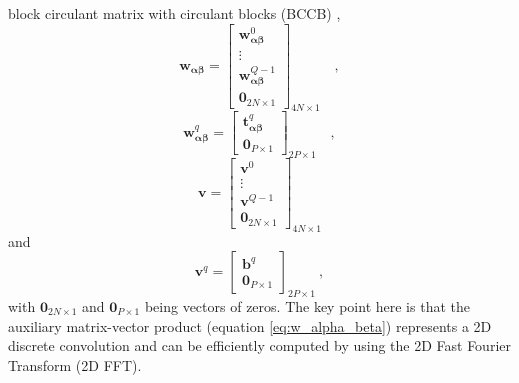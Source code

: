 \documentclass[manuscript,noblind]{geophysics}
\begin{document}
block circulant matrix with circulant blocks (BCCB) \citep[e.g., ][ p. 184]{davis1979},
\begin{equation}
	\mathbf{w}_{\boldsymbol{\alpha\beta}} = \begin{bmatrix}
		\mathbf{w}_{\boldsymbol{\alpha\beta}}^{0} \\
		\vdots \\
		\mathbf{w}_{\boldsymbol{\alpha\beta}}^{Q - 1} \\
		\mathbf{0}_{2N \times 1}
	\end{bmatrix}_{4N \times 1} \quad ,
	\label{eq:w_alpha_beta_partitioned}
\end{equation}
\begin{equation}
	\mathbf{w}_{\boldsymbol{\alpha\beta}}^{q} = \begin{bmatrix}
		\mathbf{t}^{q}_{\boldsymbol{\alpha\beta}} \\
		\mathbf{0}_{P \times 1}
	\end{bmatrix}_{2P \times 1}
	\label{eq:wq-vector} \quad ,
\end{equation}
\begin{equation}
	\mathbf{v} = \begin{bmatrix}
		\mathbf{v}^{0} \\
		\vdots \\
		\mathbf{v}^{Q - 1} \\
		\mathbf{0}_{2N \times 1}
	\end{bmatrix}_{4N \times 1}
	\label{eq:v-vector}
\end{equation}
and
\begin{equation}
	\mathbf{v}^{q} = \begin{bmatrix}
		\mathbf{b}^{q} \\
		\mathbf{0}_{P \times 1}
	\end{bmatrix}_{2P \times 1} \: ,
	\label{eq:vq-vector} 
\end{equation}
with $\mathbf{0}_{2N \times 1}$ and $\mathbf{0}_{P \times 1}$ being vectors of zeros.
The key point here is that the auxiliary matrix-vector product
(equation \ref{eq:w_alpha_beta}) represents a 2D discrete convolution and can be 
efficiently computed by using the 2D Fast Fourier Transform (2D FFT). 
\end{document}
